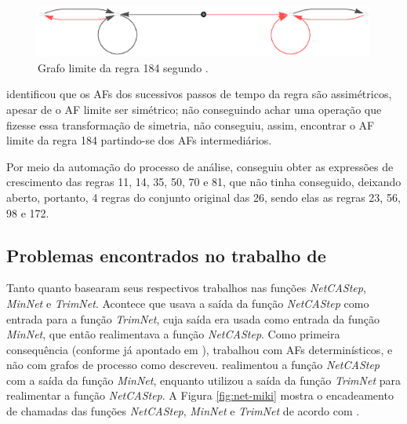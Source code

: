 \documentclass[12pt,a4paper]{article}
\begin{document}
\begin{figure}[htp]
\begin{center}
\includegraphics[scale=0.8]{img/limit184.eps}
\caption[Grafo limite da regra 184]
{Grafo limite da regra 184 segundo .}
\label{fig:limit184}
\end{center}
\end{figure}

 identificou que os AFs dos sucessivos passos de
tempo da regra são assimétricos, apesar de o AF limite ser simétrico; não
conseguindo achar uma operação que fizesse essa transformação de simetria,
não conseguiu, assim, encontrar o AF limite da regra 184
partindo-se dos AFs intermediários.

Por meio da automação do processo de análise,  conseguiu
obter as expressões de crescimento das regras 11, 14, 35, 50, 70 e 81, que
 não tinha conseguido, deixando aberto, portanto, 4
regras do conjunto original das 26, sendo elas as regras 23, 56, 98 e 172.

\subsection{Problemas encontrados no trabalho de
}\label{sec:problem}

Tanto  quanto  basearam seus
respectivos trabalhos nas funções \emph{NetCAStep}, \emph{MinNet} e \emph{TrimNet}.
Acontece que  usava a saída da função \emph{NetCAStep} como entrada
para a função \emph{TrimNet}, cuja saída era usada como entrada da função
\emph{MinNet}, que então realimentava a função \emph{NetCAStep}. Como primeira
consequência (conforme já apontado em ),
 trabalhou com AFs determinísticos, e não com
grafos de processo como descreveu.  realimentou
a função \emph{NetCAStep} com a saída da função \emph{MinNet}, enquanto
 utilizou a saída da função \emph{TrimNet} para realimentar
a função \emph{NetCAStep}. A Figura \ref{fig:net-miki} mostra o encadeamento de
chamadas das funções \emph{NetCAStep}, \emph{MinNet} e \emph{TrimNet} de acordo com
.
\end{document}
